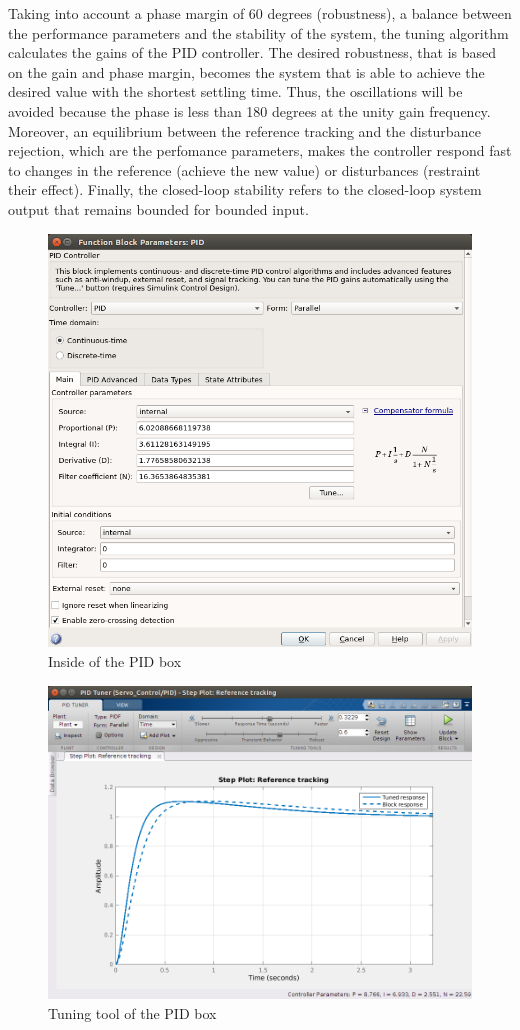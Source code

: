 Taking into account a phase margin of 60 degrees (robustness), a balance between the performance parameters and the stability of the system, the tuning algorithm calculates the gains of the PID controller. The desired robustness, that is based on the gain and phase margin, becomes the system that is able to achieve the desired value with the shortest settling time. Thus, the oscillations will be avoided because the phase is less than 180 degrees at the unity gain frequency. Moreover, an equilibrium between the reference tracking and the disturbance rejection, which are the perfomance parameters, makes the controller respond fast to changes in the reference (achieve the new value) or disturbances (restraint their effect). Finally, the closed-loop stability refers to the closed-loop system output that remains bounded for bounded input.

\begin{figure}[H]
\centering
\includegraphics[scale=0.4]{figures/PID_window.png}
\caption{Inside of the PID box}
\label{dcmotor_circuit}
\end{figure}


\begin{figure}[H]
\centering
\includegraphics[scale=0.4]{figures/PID_param.png}
\caption{Tuning tool of the PID box}
\label{dcmotor_circuit}
\end{figure}
  


